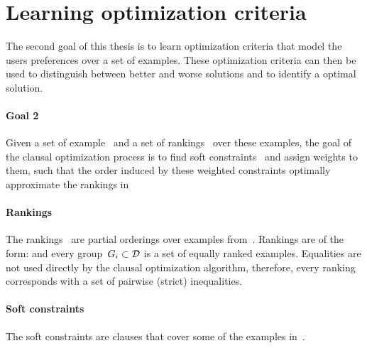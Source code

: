 
\section{Learning optimization criteria}
\label{sec:learning_user_preferences}
\label{sec:learning_optimization_criteria}

The second goal of this thesis is to learn optimization criteria that model the users preferences over a set of examples.
These optimization criteria can then be used to distinguish between better and worse solutions and to identify a optimal solution.

\begin{framed}
	\noindent
	\begin{minipage}{\textwidth}
		\paragraph{Goal 2}
		Given a set of example~ and a set of rankings~ over these examples, the goal of the clausal optimization process is to find soft constraints~ and assign weights to them, such that the order induced by these weighted constraints  optimally approximate the rankings in 
	\end{minipage}
\end{framed}

\paragraph{Rankings}
The rankings~ are partial orderings over examples from~.
Rankings are of the form:  and every group~$G_i \subset \mathcal{D}$ is a set of equally ranked examples. Equalities are not used directly by the clausal optimization algorithm, therefore, every ranking corresponds with a set of pairwise (strict) inequalities.

\paragraph{Soft constraints}
The soft constraints are clauses that cover some of the examples in~.

